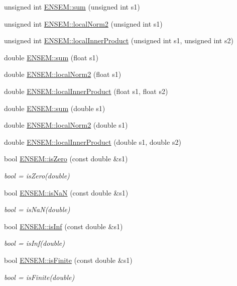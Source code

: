 \begin{DoxyCompactItemize}
unsigned int \mbox{\hyperlink{group__simpleword_ga935361714bfaafc123769fd11a4c1e85}{E\+N\+S\+E\+M\+::sum}} (unsigned int s1)
\item 
unsigned int \mbox{\hyperlink{group__simpleword_ga7ccc2671554c8711749195fe90772565}{E\+N\+S\+E\+M\+::local\+Norm2}} (unsigned int s1)
\item 
unsigned int \mbox{\hyperlink{group__simpleword_gacfa602b05feec2ea8f20fa767834c049}{E\+N\+S\+E\+M\+::local\+Inner\+Product}} (unsigned int s1, unsigned int s2)
\item 
double \mbox{\hyperlink{group__simpleword_gabcfac0639bfa76f82af16345860b6de9}{E\+N\+S\+E\+M\+::sum}} (float s1)
\item 
double \mbox{\hyperlink{group__simpleword_gaf236f47bd2b5cd9a61a0c11732c85624}{E\+N\+S\+E\+M\+::local\+Norm2}} (float s1)
\item 
double \mbox{\hyperlink{group__simpleword_ga29c49899c1c008855b6de7e6eb937893}{E\+N\+S\+E\+M\+::local\+Inner\+Product}} (float s1, float s2)
\item 
double \mbox{\hyperlink{group__simpleword_ga1c90ffe9d470fcf3fa16425a40f8fe79}{E\+N\+S\+E\+M\+::sum}} (double s1)
\item 
double \mbox{\hyperlink{group__simpleword_ga439dd5edaf993eb5a6cc2c943b3b7f55}{E\+N\+S\+E\+M\+::local\+Norm2}} (double s1)
\item 
double \mbox{\hyperlink{group__simpleword_gab6f623d6de3ec5cfdd1bdd30d067b64d}{E\+N\+S\+E\+M\+::local\+Inner\+Product}} (double s1, double s2)
\item 
bool \mbox{\hyperlink{group__simpleword_ga4696caf7dc1e9600520fb4255cc74d92}{E\+N\+S\+E\+M\+::is\+Zero}} (const double \&s1)
\begin{DoxyCompactList}\small\item\em bool = is\+Zero(double) \end{DoxyCompactList}\item 
bool \mbox{\hyperlink{group__simpleword_gaa7a998c5bfdb665a4e386ccc415407bd}{E\+N\+S\+E\+M\+::is\+NaN}} (const double \&s1)
\begin{DoxyCompactList}\small\item\em bool = is\+Na\+N(double) \end{DoxyCompactList}\item 
bool \mbox{\hyperlink{group__simpleword_ga915c6e8e5b5de2ebf1b3a8e57f95bf2f}{E\+N\+S\+E\+M\+::is\+Inf}} (const double \&s1)
\begin{DoxyCompactList}\small\item\em bool = is\+Inf(double) \end{DoxyCompactList}\item 
bool \mbox{\hyperlink{group__simpleword_ga9bc1e56e3c76d5eb1575eb3eed62ea40}{E\+N\+S\+E\+M\+::is\+Finite}} (const double \&s1)
\begin{DoxyCompactList}\small\item\em bool = is\+Finite(double) \end{DoxyCompactList}\end{DoxyCompactItemize}


